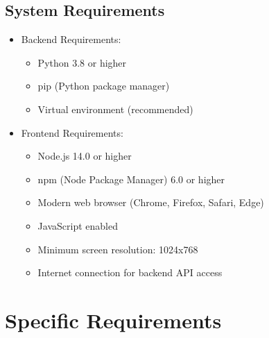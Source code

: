 \documentclass[12pt,a4paper]{article}
\begin{document}
\subsection{System Requirements}
\begin{itemize}
    \item Backend Requirements:
    \begin{itemize}
        \item Python 3.8 or higher
        \item pip (Python package manager)
        \item Virtual environment (recommended)
    \end{itemize}
    \item Frontend Requirements:
    \begin{itemize}
        \item Node.js 14.0 or higher
        \item npm (Node Package Manager) 6.0 or higher
        \item Modern web browser (Chrome, Firefox, Safari, Edge)
        \item JavaScript enabled
        \item Minimum screen resolution: 1024x768
        \item Internet connection for backend API access
    \end{itemize}
\end{itemize}

\section{Specific Requirements}
\end{document}
